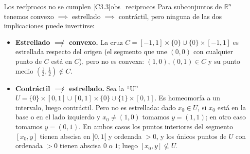 \begin{observacion}{Los recíprocos no se cumplen [C3.3]}{obs_reciprocos}
Para subconjuntos de $\mathbb{R}^n$ tenemos convexo $\implies$ estrellado $\implies$ contráctil, pero ninguna de las dos implicaciones puede invertirse:
\begin{itemize}
    \item \textbf{Estrellado $\not\implies$ convexo.} La cruz $C = [-1,1] \times \{0\} \cup \{0\} \times [-1,1]$ es estrellada respecto del origen (el segmento que une $(0,0)$ con cualquier punto de $C$ está en $C$), pero no es convexa: $(1,0), (0,1) \in C$ y su punto medio $(\tfrac12, \tfrac12) \notin C$.
    \item \textbf{Contráctil $\not\implies$ estrellado.} Sea la ``U'' $U = \{0\} \times [0,1] \cup [0,1] \times \{0\} \cup \{1\} \times [0,1]$. Es homeomorfa a un intervalo, luego contráctil. Pero no es estrellada: dado $x_0 \in U$, si $x_0$ está en la base o en el lado izquierdo y $x_0 \neq (1,0)$ tomamos $y = (1,1)$; en otro caso tomamos $y = (0,1)$. En ambos casos los puntos interiores del segmento $[x_0, y]$ tienen abscisa en $]0,1[$ y ordenada $> 0$, y los únicos puntos de $U$ con ordenada $> 0$ tienen abscisa $0$ o $1$; luego $[x_0,y] \not\subseteq U$.
\end{itemize}
\end{observacion}
